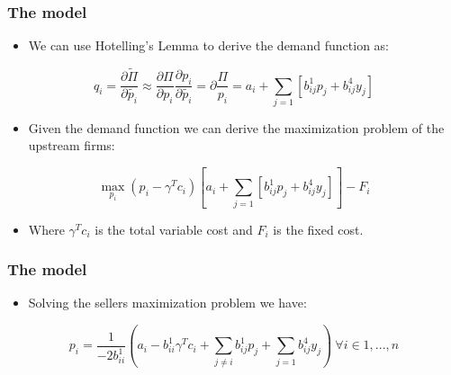 \documentclass{beamer}
\begin{document}
\begin{frame}
  \frametitle{The model}
  \begin{itemize}
    \item We can use Hotelling's Lemma to derive the demand function as:
  \end{itemize}

  \[ q_i = \frac{\partial \tilde{\Pi}}{\partial \tilde{p_i}} \approx \frac{\partial\Pi}{\partial p_i}\frac{\partial p_i}{\partial \tilde{p_i}} = \partial \frac{\Pi}{p_i} = a_i + \sum_{j=1} [b^1_{ij}p_j + b^4_{ij}y_j] \]

  \begin{itemize}
    \item Given the demand function we can derive the maximization problem of the upstream firms:
  \end{itemize}

  \[ \max_{p_i} (p_i - \gamma^Tc_i)\left[a_i + \sum_{j=1} [b^1_{ij}p_j + b^4_{ij}y_j] \right] - F_i \]

  \begin{itemize}
    \item Where $\gamma^Tc_i$ is the total variable cost and $F_i$ is the fixed cost.
  \end{itemize}
  
\end{frame}

\begin{frame}
  \frametitle{The model}
  \begin{itemize}
    \item Solving the sellers maximization problem we have:
  \end{itemize}

  \[ p_i = \frac{1}{-2b^1_{ii}}\left(a_i - b^1_{ii}\gamma^Tc_i + \sum_{j\ne i} b^1_{ij}p_j + \sum_{j=1} b^4_{ij}y_j \right)\ \forall i \in {1, ..., n} \]

\end{frame}
\end{document}
